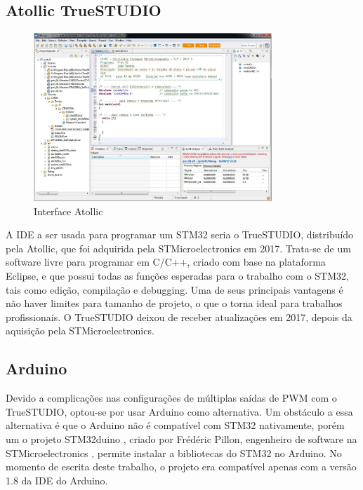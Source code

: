 \subsection{Atollic TrueSTUDIO}

\begin{figure}[ht]
	\centering
	\includegraphics[width=0.8\textwidth]{figures/atollic}
	\caption{Interface Atollic \cite{apostila_microprossados}}
\end{figure}

A IDE a ser usada para programar um STM32 seria o TrueSTUDIO, distribuído pela
Atollic, que foi adquirida pela STMicroelectronics em 2017. Trata-se de um
software livre para programar em C/C++, criado com base na plataforma Eclipse,
e que possui todas as funções esperadas para o trabalho com o STM32, tais como
edição, compilação e debugging. Uma de seus principais vantagens é não haver
limites para tamanho de projeto, o que o torna ideal para trabalhos
profissionais. O TrueSTUDIO deixou de receber atualizações em 2017,
depois da aquisição pela STMicroelectronics.\cite{apostila_microprossados}



\subsection{Arduino}
Devido a complicações nas configurações de múltiplas saídas de PWM com o
TrueSTUDIO, optou-se por usar Arduino como alternativa. Um obstáculo a essa
alternativa é que o Arduino não é compatível com STM32 nativamente, porém um
o projeto STM32duino \cite{STM32duino}, criado por Frédéric Pillon, engenheiro
de software na STMicroelectronics \cite{fpistm}, permite instalar a bibliotecas
do STM32 no Arduino. No momento de escrita deste trabalho, o projeto era
compatível apenas com a versão 1.8 da IDE do Arduino.

